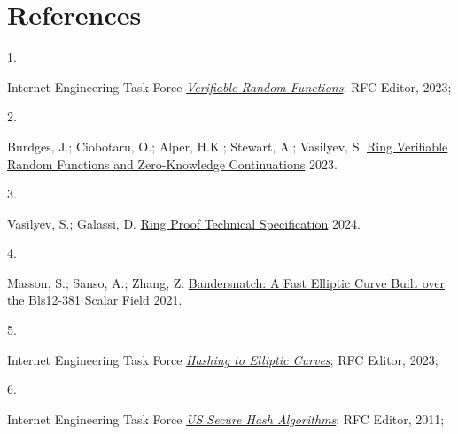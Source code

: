 \documentclass[
]{article}
\newlength{\cslhangindent}
\newlength{\csllabelwidth}
\newlength{\cslentryspacingunit} %
\newenvironment{CSLReferences}[2] %
 {%
  \setlength{\parindent}{0pt}
  \ifodd #1
  \let\oldpar\par
  \def\par{\hangindent=\cslhangindent\oldpar}
  \fi
  \setlength{\parskip}{#2\cslentryspacingunit}
 }%
 {}
\newcommand{\CSLLeftMargin}[1]{\parbox[t]{\csllabelwidth}{#1}}
\newcommand{\CSLRightInline}[1]{\parbox[t]{\linewidth - \csllabelwidth}{#1}\break}
\begin{document}
\hypertarget{references}{%
\section*{References}\label{references}}

\hypertarget{refs}{}
\begin{CSLReferences}{0}{0}
\leavevmode{}%
\CSLLeftMargin{1. }
\CSLRightInline{Internet Engineering Task Force
\emph{\href{https://datatracker.ietf.org/doc/rfc9381}{{Verifiable Random
Functions}}}; {RFC Editor}, 2023;}

\leavevmode{}%
\CSLLeftMargin{2. }
\CSLRightInline{Burdges, J.; Ciobotaru, O.; Alper, H.K.; Stewart, A.;
Vasilyev, S. \href{https://eprint.iacr.org/2023/002}{Ring Verifiable
Random Functions and Zero-Knowledge Continuations} 2023.}

\leavevmode{}%
\CSLLeftMargin{3. }
\CSLRightInline{Vasilyev, S.; Galassi, D.
\href{https://github.com/davxy/ring-proof-spec}{Ring Proof Technical
Specification} 2024.}

\leavevmode{}%
\CSLLeftMargin{4. }
\CSLRightInline{Masson, S.; Sanso, A.; Zhang, Z.
\href{https://eprint.iacr.org/2021/1152}{Bandersnatch: A Fast Elliptic
Curve Built over the Bls12-381 Scalar Field} 2021.}

\leavevmode{}%
\CSLLeftMargin{5. }
\CSLRightInline{Internet Engineering Task Force
\emph{\href{https://datatracker.ietf.org/doc/rfc9380}{{Hashing to
Elliptic Curves}}}; {RFC Editor}, 2023;}

\leavevmode{}%
\CSLLeftMargin{6. }
\CSLRightInline{Internet Engineering Task Force
\emph{\href{https://datatracker.ietf.org/doc/rfc6234}{{US Secure Hash
Algorithms}}}; {RFC Editor}, 2011;}

\end{CSLReferences}
\end{document}
